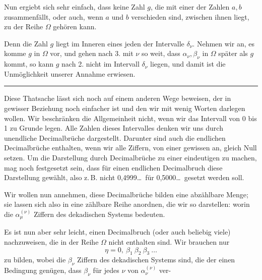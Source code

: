 
Nun ergiebt sich sehr einfach, dass keine Zahl $g$, die mit einer der Zahlen $a, b$ zusammenf\"allt, oder auch, wenn $a$ und $b$ verschieden sind, zwischen ihnen liegt, zu der Reihe $\Omega$ geh\"oren kann.

Denn die Zahl $g$ liegt im Inneren eines jeden der Intervalle $\delta_\nu$. Nehmen wir an, es komme $g$ in $\Omega$ vor, und gehen nach 3. mit $\nu$ so weit, dass $\alpha_\nu, \beta_\nu$ in $\Omega$ sp\"ater als $g$ kommt, so kann $g$ nach 2. nicht im Intervall $\delta_\nu$ liegen, und damit ist die Unm\"oglichkeit unserer Annahme erwiesen.


\begin{center}
\rule{4cm}{0.4pt}
\end{center}

Diese Thatsache l\"asst sich noch auf einem anderen Wege beweisen, der in gewisser Beziehung noch einfacher ist und den wir mit wenig Worten darlegen wollen. Wir beschr\"anken die Allgemeinheit nicht, wenn wir das Intervall von 0 bis 1 zu Grunde legen. Alle Zahlen dieses Intervalles denken wir uns durch unendliche Decimalbr\"uche dargestellt. Darunter sind auch die endlichen Decimalbr\"uche enthalten, wenn wir alle Ziffern, von einer gewissen an, gleich Null setzen. Um die Darstellung durch Decimalbr\"uche zu einer eindeutigen zu machen, mag noch festgesetzt sein, dass f\"ur einen endlichen Decimalbruch  diese Darstellung gew\"ahlt, also z.\,B. nicht 0,4999\dots\ f\"ur 0,5000\dots\ gesetzt werden soll.

Wir wollen nun annehmen, diese Decimalbr\"uche bilden eine abz\"ahlbare Menge; sie lassen sich also in eine z\"ahlbare Reihe anordnen, die wir so darstellen:
worin die $\alpha_\mu^{(\nu)}$ Ziffern des dekadischen Systems bedeuten.

Es ist nun aber sehr leicht, einen Decimalbruch (oder auch beliebig viele) nachzuweisen, die in der Reihe $\Omega$ nicht enthalten sind. Wir brauchen nur
\[
\eta = 0,\ \beta_1\ \beta_2\ \beta_3\ \dots
\]
zu bilden, wobei die $\beta_\nu$ Ziffern des dekadischen Systems sind, die der einen Bedingung gen\"ugen, dass $\beta_\nu$ f\"ur jedes $\nu$ von $\alpha_\nu^{(\nu)}$ ver-
